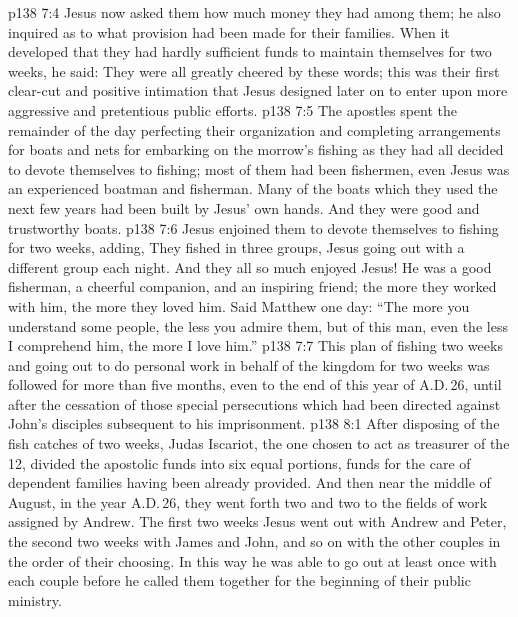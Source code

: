 \vs p138 7:4 Jesus now asked them how much money they had among them; he also inquired as to what provision had been made for their families. When it developed that they had hardly sufficient funds to maintain themselves for two weeks, he said:  They were all greatly cheered by these words; this was their first clear\hyp{}cut and positive intimation that Jesus designed later on to enter upon more aggressive and pretentious public efforts.
\vs p138 7:5 The apostles spent the remainder of the day perfecting their organization and completing arrangements for boats and nets for embarking on the morrow’s fishing as they had all decided to devote themselves to fishing; most of them had been fishermen, even Jesus was an experienced boatman and fisherman. Many of the boats which they used the next few years had been built by Jesus’ own hands. And they were good and trustworthy boats.
\vs p138 7:6 Jesus enjoined them to devote themselves to fishing for two weeks, adding,  They fished in three groups, Jesus going out with a different group each night. And they all so much enjoyed Jesus! He was a good fisherman, a cheerful companion, and an inspiring friend; the more they worked with him, the more they loved him. Said Matthew one day: “The more you understand some people, the less you admire them, but of this man, even the less I comprehend him, the more I love him.”
\vs p138 7:7 This plan of fishing two weeks and going out to do personal work in behalf of the kingdom for two weeks was followed for more than five months, even to the end of this year of A.D.\,26, until after the cessation of those special persecutions which had been directed against John’s disciples subsequent to his imprisonment.
\vs p138 8:1 After disposing of the fish catches of two weeks, Judas Iscariot, the one chosen to act as treasurer of the 12, divided the apostolic funds into six equal portions, funds for the care of dependent families having been already provided. And then near the middle of August, in the year A.D.\,26, they went forth two and two to the fields of work assigned by Andrew. The first two weeks Jesus went out with Andrew and Peter, the second two weeks with James and John, and so on with the other couples in the order of their choosing. In this way he was able to go out at least once with each couple before he called them together for the beginning of their public ministry.
